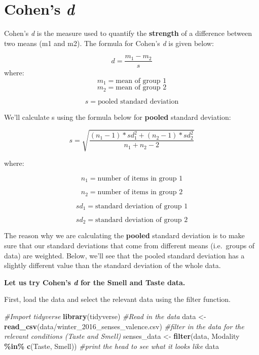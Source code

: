 \documentclass[
]{book}
\newenvironment{Shaded}{\begin{snugshade}}{\end{snugshade}}
\newcommand{\CommentTok}[1]{\textcolor[rgb]{0.56,0.35,0.01}{\textit{#1}}}
\newcommand{\FunctionTok}[1]{\textcolor[rgb]{0.13,0.29,0.53}{\textbf{#1}}}
\newcommand{\NormalTok}[1]{#1}
\newcommand{\OtherTok}[1]{\textcolor[rgb]{0.56,0.35,0.01}{#1}}
\newcommand{\SpecialCharTok}[1]{\textcolor[rgb]{0.81,0.36,0.00}{\textbf{#1}}}
\newcommand{\StringTok}[1]{\textcolor[rgb]{0.31,0.60,0.02}{#1}}
\begin{document}
\hypertarget{cohens-d}{%
\section{\texorpdfstring{Cohen's \emph{d}}{Cohen's d}}\label{cohens-d}}

Cohen's \emph{d} is the measure used to quantify the \textbf{strength} of a difference between two means (m1 and m2). The formula for Cohen's \emph{d} is given below:

\[d = \frac{m_1-m_2}{s}\]
where:
\[m_1 = \text{mean of group 1}\]
\[m_2 = \text{mean of group 2}\]

\[s = \text{pooled standard deviation}\]

We'll calculate s using the formula below for \textbf{pooled} standard deviation:

\[s = \sqrt{\frac{(n_1-1)*sd_1^2 + (n_2-1)*sd_2^2}{n_1+n_2-2}}\]

where:

\[n_1 = \text{number of items in group 1}\]

\[n_2 = \text{number of items in group 2}\]

\[sd_1 = \text{standard deviation of group 1}\]

\[sd_2 = \text{standard deviation of group 2}\]

The reason why we are calculating the \textbf{pooled} standard deviation is to make sure that our standard deviations that come from different means (i.e.~groups of data) are weighted. Below, we'll see that the pooled standard deviation has a slightly different value than the standard deviation of the whole data.

\textbf{Let us try Cohen's \emph{d} for the Smell and Taste data. }

First, load the data and select the relevant data using the filter function.

\begin{Shaded}
\begin{Highlighting}[]
\CommentTok{\#Import tidyverse}
\FunctionTok{library}\NormalTok{(tidyverse)}
\CommentTok{\#Read in the data}
\NormalTok{data }\OtherTok{\textless{}{-}} \FunctionTok{read\_csv}\NormalTok{(}\StringTok{\textquotesingle{}data/winter\_2016\_senses\_valence.csv\textquotesingle{}}\NormalTok{)}
\CommentTok{\#filter in the data for the relevant conditions (Taste and Smell)}
\NormalTok{senses\_data }\OtherTok{\textless{}{-}} \FunctionTok{filter}\NormalTok{(data, Modality }\SpecialCharTok{\%in\%} \FunctionTok{c}\NormalTok{(}\StringTok{\textquotesingle{}Taste\textquotesingle{}}\NormalTok{, }\StringTok{\textquotesingle{}Smell\textquotesingle{}}\NormalTok{))}
\CommentTok{\#print the head to see what it looks like}
\NormalTok{data}
\end{Highlighting}
\end{Shaded}
\end{document}
